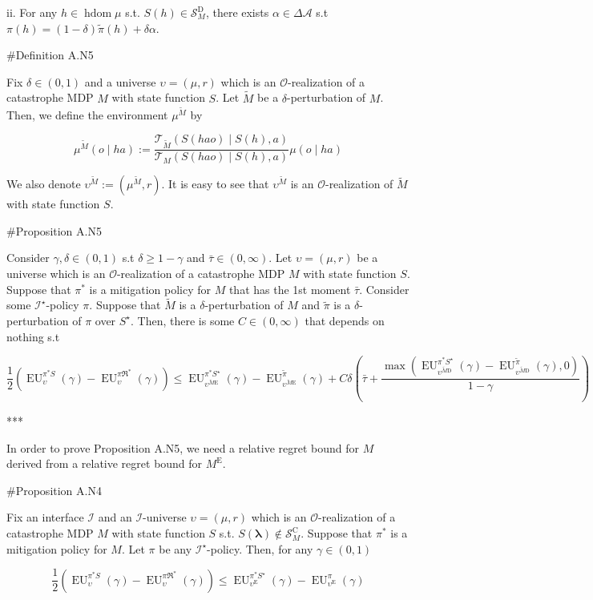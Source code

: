 \documentclass[a4paper]{article}
\newcommand{\AP}[1]{\left(#1\right)}
\newcommand{\Estr}{\boldsymbol{\lambda}}
\newcommand{\Ob}{\mathcal{O}}
\newcommand{\A}{\mathcal{A}}
\newcommand{\St}{\mathcal{S}}
\newcommand{\T}{\mathcal{T}}
\newcommand{\In}{\mathcal{I}}
\DeclareMathOperator{\HD}{hdom}
\newcommand{\RMC}{\mathrm{C}}
\newcommand{\RMD}{\mathrm{D}}
\newcommand{\RME}{\mathrm{E}}
\newcommand{\SD}{\St^{\RMD}}
\newcommand{\SC}{\St^{\RMC}}
\newcommand{\ME}{M^{\RME}}
\newcommand{\EU}{\operatorname{EU}}
\begin{document}
ii. For any $h \in \HD{\mu}$ s.t. $S(h)\in\SD_M$, there exists $\alpha\in\Delta\A$ s.t $\pi(h)=(1-\delta)\tilde{\pi}(h)+\delta\alpha$.

\#Definition A.N5

Fix $\delta\in(0,1)$ and a universe $\upsilon=(\mu,r)$ which is an $\Ob$-realization of a catastrophe MDP $M$ with state function $S$. Let $\tilde{M}$ be a $\delta$-perturbation of $M$. Then, we define the environment $\mu^{\tilde{M}}$ by

$$\mu^{\tilde{M}}(o \mid ha) := \frac{\T_{\tilde{M}}\AP{S(hao) \mid S(h),a}}{\T_{M}\AP{S(hao) \mid S(h),a}}\mu(o \mid ha)$$

We also denote $\upsilon^{\tilde{M}}:=\AP{\mu^{\tilde{M}},r}$. It is easy to see that $\upsilon^{\tilde{M}}$ is an $\Ob$-realization of $\tilde{M}$ with state function $S$.

\#Proposition A.N5

Consider $\gamma,\delta\in(0,1)$ s.t $\delta \geq 1 - \gamma$ and $\bar{\tau}\in(0,\infty)$. Let $\upsilon=(\mu,r)$ be a universe which is an $\Ob$-realization of a catastrophe MDP $M$ with state function $S$. Suppose that $\pi^*$ is a mitigation policy for $M$ that has the 1st moment $\bar{\tau}$. Consider some $\In^\star$-policy $\pi$. Suppose that $\tilde{M}$ is a $\delta$-perturbation of $M$ and $\tilde{\pi}$ is a $\delta$-perturbation of $\pi$ over $S^\star$. Then, there is some $C\in(0,\infty)$ that depends on nothing s.t

$$\frac{1}{2}\AP{\EU_{\upsilon}^{\pi^* S}(\gamma)-\EU_{\upsilon}^{\pi\Re^*}(\gamma)} \leq \EU_{\upsilon^{\tilde{M}\RME}}^{\pi^* S^\star}(\gamma)-\EU_{\upsilon^{\tilde{M}\RME}}^{\tilde{\pi}}(\gamma) + C\delta\AP{\bar{\tau}+\frac{\max\AP{\EU_{\upsilon^{\tilde{M}\RMD}}^{\pi^* S^\star}(\gamma)-\EU_{\upsilon^{\tilde{M}\RMD}}^{\tilde{\pi}}(\gamma),0}}{1-\gamma}}$$

***

In order to prove Proposition A.N5, we need a relative regret bound for $M$ derived from a relative regret bound for $\ME$.

\#Proposition A.N4

Fix an interface $\In$ and an $\In$-universe $\upsilon=(\mu,r)$ which is an $\Ob$-realization of a catastrophe MDP $M$ with state function $S$ s.t. $S(\Estr)\not\in\SC_M$. Suppose that $\pi^*$ is a mitigation policy for $M$. Let $\pi$ be any $\In^\star$-policy. Then, for any $\gamma\in(0,1)$

$$\frac{1}{2}\AP{\EU_{\upsilon}^{\pi^* S}(\gamma)-\EU_{\upsilon}^{\pi\Re^*}(\gamma)} \leq \EU_{\upsilon^\RME}^{\pi^* S^\star}(\gamma)-\EU_{\upsilon^\RME}^{\pi}(\gamma)$$
\end{document}
